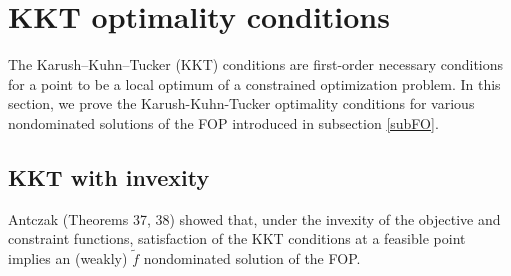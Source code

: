 \documentclass{article}
\theoremstyle{definition}
\newtheorem{prop}[maar]{Proposition}
\begin{document}

\section{KKT optimality conditions}\label{KKT conditions}
The Karush–Kuhn–Tucker (KKT) conditions are first-order necessary conditions for a point to be a local optimum of a constrained optimization problem.
In this section, we prove the Karush-Kuhn-Tucker optimality conditions for various nondominated solutions of the FOP introduced in subsection \ref{subFO}.

\subsection{KKT with invexity}

Antczak \cite{Ant} (Theorems 37, 38) showed that, under the invexity of the objective and
constraint functions, satisfaction of the KKT conditions at a feasible point
implies an (weakly) $\tilde f$ nondominated solution of the FOP.  
\end{document}
